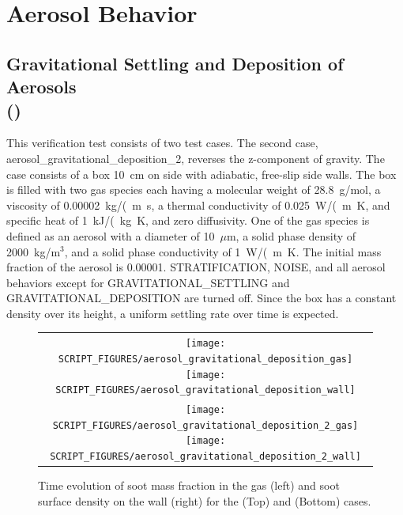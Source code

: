 \documentclass[11pt]{book}
\begin{document}
\section{Aerosol Behavior}
\subsection{Gravitational Settling and Deposition of Aerosols\\(\texorpdfstring{}{aerosol\_gravitational\_deposition})}
    \label{aerosol_gravitational_deposition}

This verification test consists of two test cases. The second case, {\ct aerosol\_gravitational\_deposition\_2}, reverses the z-component of gravity. The case consists of a box 10~cm on side with adiabatic, free-slip side walls. The box is filled with two gas species each having a molecular weight of 28.8~g/mol, a viscosity of 0.00002~\si{kg/(m.s}, a thermal conductivity of 0.025~\si{W/(m.K}, and specific heat of 1~\si{kJ/(kg.K}, and zero diffusivity. One of the gas species is defined as an aerosol with a diameter of 10~$\mu$m, a solid phase density of 2000~kg/m$^3$, and a solid phase conductivity of 1~\si{W/(m.K}. The initial mass fraction of the aerosol is 0.00001. {\ct STRATIFICATION}, {\ct NOISE}, and all aerosol behaviors except for {\ct GRAVITATIONAL\_SETTLING} and {\ct GRAVITATIONAL\_DEPOSITION} are turned off. Since the box has a constant density over its height, a uniform settling rate over time is expected.

\begin{figure}[ht]
    \centering
    \begin{tabular}{c}
        \texttt{[image: SCRIPT\_FIGURES/aerosol\_gravitational\_deposition\_gas]}
        \texttt{[image: SCRIPT\_FIGURES/aerosol\_gravitational\_deposition\_wall]} \\
        \texttt{[image: SCRIPT\_FIGURES/aerosol\_gravitational\_deposition\_2\_gas]}
        \texttt{[image: SCRIPT\_FIGURES/aerosol\_gravitational\_deposition\_2\_wall]}
    \end{tabular}
    \caption[Gas phase soot mass fractions and wall surface densities for gravitational deposition]{Time evolution of soot mass fraction in the gas (left) and soot surface density on the wall (right) for the  (Top) and  (Bottom) cases.}
    \label{fig:gravitational_deposition}
\end{figure}
\end{document}
